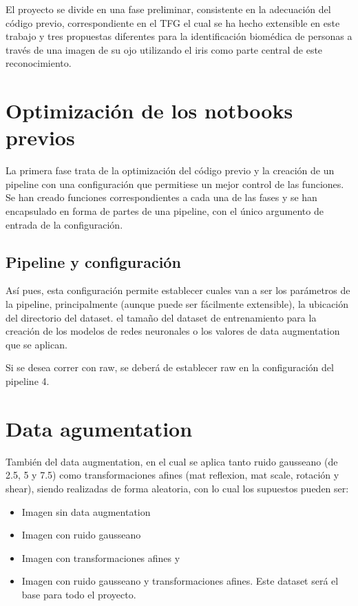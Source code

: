 
El proyecto se divide en una fase preliminar, consistente en la adecuación del código previo, correspondiente en el TFG
el cual se ha hecho extensible en este trabajo y tres propuestas diferentes para la identificación biomédica de personas 
a través de una imagen de su ojo utilizando el iris como parte central de este reconocimiento.

\section{Optimización de los notbooks previos}

La primera fase trata de la optimización del código previo y la creación de un pipeline con una configuración que permitiese un mejor control de las funciones.
Se han creado funciones correspondientes a cada una de las fases y se han encapsulado en forma de partes de una pipeline, con el único argumento de entrada de la 
configuración. 


\subsection{Pipeline y configuración} 

Así pues, esta configuración permite establecer cuales van a ser los parámetros de la pipeline, principalmente (aunque puede ser fácilmente extensible),
 la ubicación del directorio del dataset. el tamaño del dataset de entrenamiento para la creación de los modelos de redes neuronales o los valores
 de data augmentation que se aplican.

 Si se desea correr con raw, se deberá de establecer raw en la configuración del pipeline 4.

\section{Data agumentation}

También del  data augmentation, en el cual se aplica tanto ruido gausseano (de 2.5, 5 y 7.5) como transformaciones afines (mat reflexion, mat scale, rotación y shear), siendo realizadas de 
forma aleatoria, con lo cual los supuestos pueden ser:

\begin{itemize}
    \item Imagen sin data augmentation
    \item Imagen con ruido gausseano
    \item Imagen con transformaciones afines y 
    \item Imagen con ruido gausseano y transformaciones afines. Este dataset será el base para todo el proyecto.
\end{itemize}

